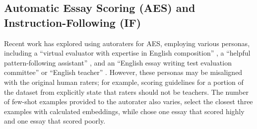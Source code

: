 

\subsection{Automatic Essay Scoring (AES) and Instruction-Following (IF)}

Recent work has explored using autoraters for AES, employing various personas, including a ``virtual evaluator with expertise in English composition'' \citep{10.1145/3706468.3706507}, a ``helpful pattern-following assistant'' \citep{mansour-etal-2024-large}, and an ``English essay writing test evaluation committee'' or ``English teacher'' \citep{lee-etal-2024-unleashing}. However, these personas may be misaligned with the original human raters; for example, scoring guidelines for a portion of the dataset from \citet{asap-aes} explicitly state that raters should not be teachers. The number of few-shot examples provided to the autorater also varies, \citet{10.1145/3706468.3706507} select the closest three examples with calculated embeddings, while \citet{kundu2024large} chose one essay that scored highly and one essay that scored poorly. 

